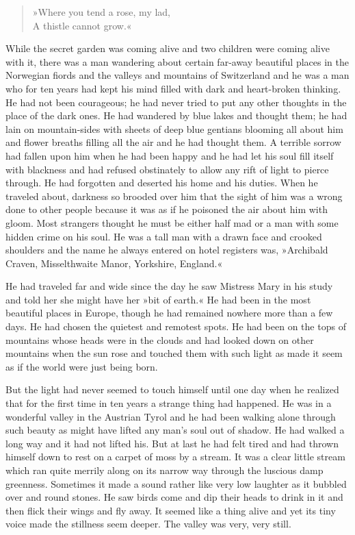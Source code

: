 \begin{verse}
»Where you tend a rose, my lad,\\
A thistle cannot grow.«
\end{verse}

While the secret garden was coming alive and two children were coming alive with it, there was a man wandering about certain far-away beautiful places in the Norwegian fiords and the valleys and mountains of Switzerland and he was a man who for ten years had kept his mind filled with dark and heart-broken thinking. He had not been courageous; he had never tried to put any other thoughts in the place of the dark ones. He had wandered by blue lakes and thought them; he had lain on mountain-sides with sheets of deep blue gentians blooming all about him and flower breaths filling all the air and he had thought them. A terrible sorrow had fallen upon him when he had been happy and he had let his soul fill itself with blackness and had refused obstinately to allow any rift of light to pierce through. He had forgotten and deserted his home and his duties. When he traveled about, darkness so brooded over him that the sight of him was a wrong done to other people because it was as if he poisoned the air about him with gloom. Most strangers thought he must be either half mad or a man with some hidden crime on his soul. He was a tall man with a drawn face and crooked shoulders and the name he always entered on hotel registers was, »Archibald Craven, Misselthwaite Manor, Yorkshire, England.«

He had traveled far and wide since the day he saw Mistress Mary in his study and told her she might have her »bit of earth.« He had been in the most beautiful places in Europe, though he had remained nowhere more than a few days. He had chosen the quietest and remotest spots. He had been on the tops of mountains whose heads were in the clouds and had looked down on other mountains when the sun rose and touched them with such light as made it seem as if the world were just being born.

But the light had never seemed to touch himself until one day when he realized that for the first time in ten years a strange thing had happened. He was in a wonderful valley in the Austrian Tyrol and he had been walking alone through such beauty as might have lifted any man's soul out of shadow. He had walked a long way and it had not lifted his. But at last he had felt tired and had thrown himself down to rest on a carpet of moss by a stream. It was a clear little stream which ran quite merrily along on its narrow way through the luscious damp greenness. Sometimes it made a sound rather like very low laughter as it bubbled over and round stones. He saw birds come and dip their heads to drink in it and then flick their wings and fly away. It seemed like a thing alive and yet its tiny voice made the stillness seem deeper. The valley was very, very still.

